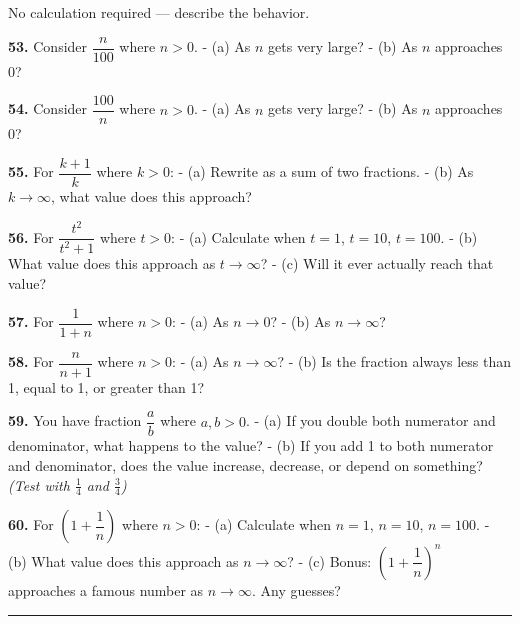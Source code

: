 \documentclass[
  11pt,
]{article}
\begin{document}
No calculation required --- describe the behavior.

\textbf{53.} Consider \(\dfrac{n}{100}\) where \(n > 0\). - (a) As \(n\)
gets very large? - (b) As \(n\) approaches 0?

\textbf{54.} Consider \(\dfrac{100}{n}\) where \(n > 0\). - (a) As \(n\)
gets very large? - (b) As \(n\) approaches 0?

\textbf{55.} For \(\dfrac{k + 1}{k}\) where \(k > 0\): - (a) Rewrite as
a sum of two fractions. - (b) As \(k \to \infty\), what value does this
approach?

\textbf{56.} For \(\dfrac{t^2}{t^2 + 1}\) where \(t > 0\): - (a)
Calculate when \(t = 1\), \(t = 10\), \(t = 100\). - (b) What value does
this approach as \(t \to \infty\)? - (c) Will it ever actually reach
that value?

\textbf{57.} For \(\dfrac{1}{1 + n}\) where \(n > 0\): - (a) As
\(n \to 0\)? - (b) As \(n \to \infty\)?

\textbf{58.} For \(\dfrac{n}{n + 1}\) where \(n > 0\): - (a) As
\(n \to \infty\)? - (b) Is the fraction always less than 1, equal to 1,
or greater than 1?

\textbf{59.} You have fraction \(\dfrac{a}{b}\) where \(a, b > 0\). -
(a) If you double both numerator and denominator, what happens to the
value? - (b) If you add 1 to both numerator and denominator, does the
value increase, decrease, or depend on something? \emph{(Test with
\(\frac{1}{4}\) and \(\frac{3}{4}\))}

\textbf{60.} For \(\left(1 + \dfrac{1}{n}\right)\) where \(n > 0\): -
(a) Calculate when \(n = 1\), \(n = 10\), \(n = 100\). - (b) What value
does this approach as \(n \to \infty\)? - (c) Bonus:
\(\left(1 + \dfrac{1}{n}\right)^n\) approaches a famous number as
\(n \to \infty\). Any guesses?

\begin{center}\rule{0.5\linewidth}{0.5pt}\end{center}
\end{document}
